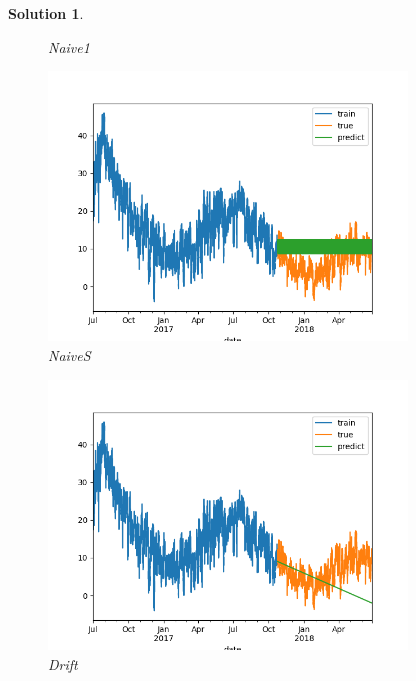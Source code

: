 \documentclass[a4paper,UTF8]{article}
\numberwithin{equation}{section}
\newtheorem*{mySol}{Solution}
\begin{document}
\begin{mySol}
\begin{figure}[htbp]
	\caption{Naive1}
\end{figure}
\begin{figure}[htbp]
	\centering
	\includegraphics[width=0.85\textwidth]{2}
	\caption{NaiveS}
\end{figure}
\begin{figure}[htbp]
	\centering
	\includegraphics[width=0.85\textwidth]{3}
	\caption{Drift}
\end{figure}

\end{mySol}

\newpage
\end{document}
